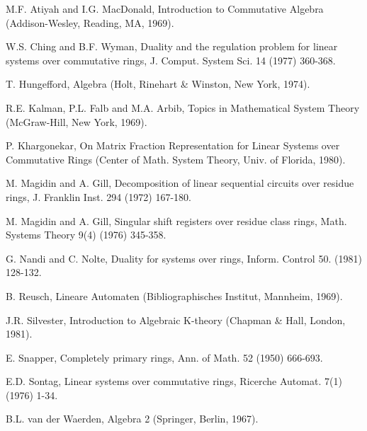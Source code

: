\documentclass[a4paper,12pt]{article}
\begin{document}
\begin{thebibliography}{99}
	
	M.F. Atiyah and I.G. MacDonald,
	Introduction to Commutative Algebra
	(Addison-Wesley, Reading, MA, 1969).
	
	W.S. Ching and B.F. Wyman,
	Duality and the regulation problem for linear systems over commutative rings,
	J. Comput. System Sci. 14 (1977) 360-368.

	T. Hungefford,
	Algebra
	(Holt, Rinehart \& Winston, New York, 1974).
	
	R.E. Kalman, P.L. Falb and M.A. Arbib,
	Topics in Mathematical System Theory
	(McGraw-Hill, New York, 1969).
	
	P. Khargonekar, On Matrix Fraction Representation for Linear Systems over Commutative Rings
	(Center of Math. System Theory, Univ. of Florida, 1980).
	
	M. Magidin and A. Gill,
	Decomposition of linear sequential circuits over residue rings,
	J. Franklin Inst. 294 (1972) 167-180.
	
	M. Magidin and A. Gill,
	Singular shift registers over residue class rings,
	Math. Systems Theory 9(4) (1976) 345-358.
	
	G. Nandi and C. Nolte,
	Duality for systems over rings,
	Inform. Control 50. (1981) 128-132.
	
	B. Reusch,
	Lineare Automaten
	(Bibliographisches Institut, Mannheim, 1969).
	
	J.R. Silvester,
	Introduction to Algebraic K-theory
	(Chapman \& Hall, London, 1981).
	
	E. Snapper,
	Completely primary rings,
	Ann. of Math. 52 (1950) 666-693.
	
	E.D. Sontag,
	Linear systems over commutative rings, Ricerche Automat.
	7(1) (1976) 1-34.
	
	B.L. van der Waerden,
	Algebra 2
	(Springer, Berlin, 1967).
	
\end{thebibliography}
\end{document}
